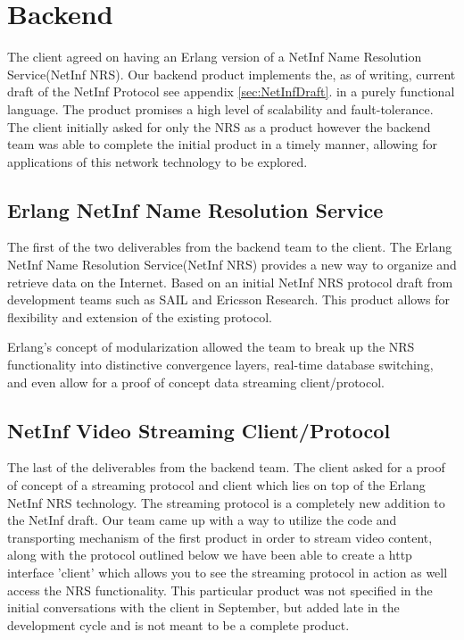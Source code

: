 \section {Backend}

The client agreed on having an Erlang version of a NetInf Name Resolution Service(NetInf NRS).  Our backend product implements the, as of writing, current draft of the NetInf Protocol see appendix  \ref{sec:NetInfDraft}.  in a purely functional language. The product promises a high level of scalability and fault-tolerance. The client initially asked for only the NRS as a product however the backend team was able to complete the initial product in a timely manner, allowing for applications of this network technology to be explored. 


\subsection {Erlang NetInf Name Resolution Service}
The first of the two deliverables from the backend team to the client. The Erlang NetInf Name Resolution Service(NetInf NRS) provides a new way to organize and retrieve data on the Internet. Based on an initial NetInf NRS protocol draft from development teams such as SAIL and Ericsson Research. This product allows for flexibility and extension of the existing protocol.

Erlang's concept of modularization allowed the team to break up the NRS functionality into distinctive convergence layers, real-time database switching, and even allow for a proof of concept data streaming client/protocol. 

\subsection{NetInf Video Streaming Client/Protocol}

The last of the deliverables from the backend team. The client asked for a proof of concept of a streaming protocol and client which lies on top of the Erlang NetInf NRS technology. The streaming protocol is a completely new addition to the NetInf draft. Our team came up with a way to utilize the code and transporting mechanism of the first product in order to stream video content, along with the protocol outlined below we have been able to create a http interface 'client' which allows you to see the streaming protocol in action as well access the NRS functionality. This particular product was not specified in the initial conversations with the client in September, but added late in the development cycle and is not meant to be a complete product.


